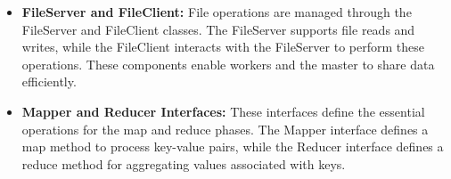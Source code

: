 \begin{itemize}
    \item \textbf{FileServer and FileClient:} File operations are managed through the FileServer and FileClient classes. The FileServer supports file reads and writes, while the FileClient interacts with the FileServer to perform these operations. These components enable workers and the master to share data efficiently.
    \item \textbf{Mapper and Reducer Interfaces:} These interfaces define the essential operations for the map and reduce phases. The Mapper interface defines a map method to process key-value pairs, while the Reducer interface defines a reduce method for aggregating values associated with keys.
\end{itemize}
